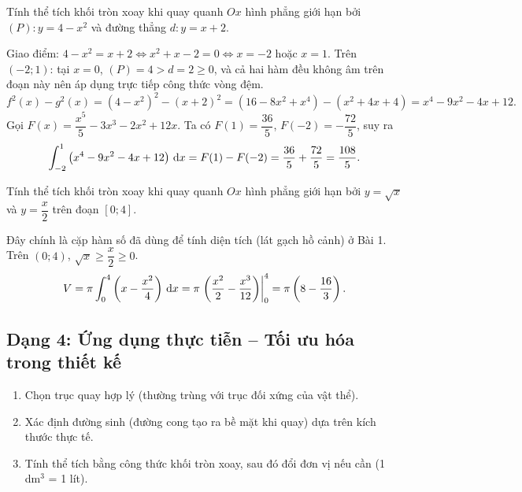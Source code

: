 \begin{hopvidu}
Tính thể tích khối tròn xoay khi quay quanh $Ox$ hình phẳng giới hạn bởi $(P): y=4-x^2$ và đường thẳng $d: y=x+2$.
\end{hopvidu}
\begin{loigiai}
Giao điểm: $4-x^2=x+2 \Leftrightarrow x^2+x-2=0 \Leftrightarrow x=-2$ hoặc $x=1$. Trên $(-2;1)$: tại $x=0$, $(P)=4 > d=2\ge0$, và cả hai hàm đều không âm trên đoạn này nên áp dụng trực tiếp công thức vòng đệm.
\[
f^2(x)-g^2(x) = (4-x^2)^2-(x+2)^2 = (16-8x^2+x^4)-(x^2+4x+4) = x^4-9x^2-4x+12.
\]
Gọi $F(x)=\dfrac{x^5}{5}-3x^3-2x^2+12x$. Ta có $F(1)=\dfrac{36}{5}$, $F(-2)=-\dfrac{72}{5}$, suy ra
\[
\int_{-2}^1\left(x^4-9x^2-4x+12\right)\,\mathrm{d}x = F(1)-F(-2) = \frac{36}{5}+\frac{72}{5}=\frac{108}{5}.
\]
\end{loigiai}

\begin{hopvidu}
Tính thể tích khối tròn xoay khi quay quanh $Ox$ hình phẳng giới hạn bởi $y=\sqrt{x}$ và $y=\dfrac{x}{2}$ trên đoạn $[0;4]$.
\end{hopvidu}
\begin{loigiai}
Đây chính là cặp hàm số đã dùng để tính diện tích (lát gạch hồ cảnh) ở Bài 1. Trên $(0;4)$, $\sqrt{x}\ge\dfrac x2\ge0$.
\[
V=\pi\int_0^4\left(x-\frac{x^2}{4}\right)\,\mathrm{d}x = \pi\left.\left(\frac{x^2}{2}-\frac{x^3}{12}\right)\right|_0^4 = \pi\left(8-\frac{16}{3}\right).
\]
\end{loigiai}

\newpage
\subsection{Dạng 4: Ứng dụng thực tiễn -- Tối ưu hóa trong thiết kế}

\begin{hopphuongphap}
\begin{enumerate}[leftmargin=1cm]
  \item Chọn trục quay hợp lý (thường trùng với trục đối xứng của vật thể).
  \item Xác định đường sinh (đường cong tạo ra bề mặt khi quay) dựa trên kích thước thực tế.
  \item Tính thể tích bằng công thức khối tròn xoay, sau đó đổi đơn vị nếu cần (1 dm$^3$ = 1 lít).
\end{enumerate}
\end{hopphuongphap}

